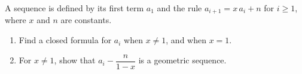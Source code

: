 A sequence is defined by its first term $a_1$ and the rule $a_{i+1}=x\,a_i+n$ for $i\ge1$, where $x$ and $n$ are constants.
\begin{enumerate}
\item[(a)] Find a closed formula for $a_i$ when $x\ne1$, and when $x=1$.
\item[(b)] For $x\ne1$, show that $a_i-\dfrac{n}{1-x}$ is a geometric sequence.
\end{enumerate}
